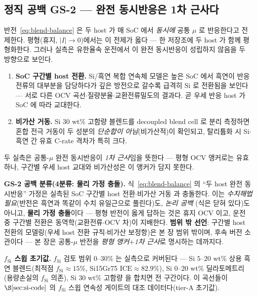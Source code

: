 \subsection{정직 공백 GS-2 --- 완전 동시반응은 1차 근사다}\label{ssec:blend-gs2}
반전~\eqref{eq:blend-balance} 은 두 host 가 매 SoC 에서 \emph{동시에} 공통 $\mu$ 로 반응한다고 전제한다.
평형(휴지, $|I|\!\to\!0$)에서는 이 전제가 옳다 --- 한 저장조에 두 host 가 함께 평형화한다. 그러나 실측은
유한율속 운전에서 이 완전 동시반응이 성립하지 않음을 두 방향으로 보인다.
\begin{enumerate}[label=(\alph*),leftmargin=2.2em,itemsep=1.5pt]
\item \textbf{SoC 구간별 host 전환.} Si/흑연 복합 연속체 모델은 높은 SoC 에서 흑연이 반응전류의 대부분을
담당하다가 깊은 방전으로 갈수록 급격히 Si 로 전환됨을 보인다 --- 서로 다른 OCV 곡선$\cdot$질량분율$\cdot$교환전류밀도의
결과다\cite{ai_composite2022}. 곧 우세 반응 host 가 SoC 에 따라 교대한다.
\item \textbf{비가산 거동.} Si $30$ wt\% 고함량 블렌드를 decoupled blend cell 로 분리 측정하면 혼합 전극
거동이 두 성분의 \emph{단순합이 아님}(비가산적)이 확인되고, 탈리튬화 시 Si$\cdot$흑연 간 유효 C-rate
격차가 특히 크다\cite{chatzogiannakis_blend2025}.
\end{enumerate}
두 실측은 공통-$\mu$ 완전 동시반응이 \emph{1차 근사}임을 뜻한다 --- 평형 OCV 앵커로는 유효하나, 구간별
우세 host 교대와 비가산성은 이 앵커가 담지 못한다.

\begin{warnbox}
\textbf{GS-2 공백 분류(4분류: 물리 가정 충돌).} 식~\eqref{eq:blend-balance} 의 ``두 host 완전 동시반응''
가정은 실측된 SoC 구간별 host 전환\cite{ai_composite2022}$\cdot$비가산 거동\cite{chatzogiannakis_blend2025}
과 충돌한다. 이는 \emph{수치해법 필요}(반전은 흑연과 똑같이 수치 유일근으로 풀린다)도, \emph{논리 공백}
(식은 닫혀 있다)도 아니고, \textbf{물리 가정 충돌}이다 --- 평형 반전이 옳게 답하는 것은 휴지 OCV 이고,
운전 중 구간별 전환은 동역학(교환전류$\cdot$OCV 차)이 지배한다. \textbf{범위 밖 선언}: 구간별 host 전환의
모델링(우세 host 전환 규칙$\cdot$비가산 보정항)은 본 장 범위 밖이며, 후속 버전 소관이다 --- 본 장은
공통-$\mu$ 반전을 \emph{평형 앵커$+$1차 근사}로 명시하는 데까지다.
\end{warnbox}

\textbf{$f_\mathrm{Si}$ 스윕 초기값.} $f_\mathrm{Si}$ 검토 범위 $0$--$30\%$ 는 실측으로 커버된다 ---
Si $5$--$20$ wt\% 상용 흑연 블렌드(최적점 $f_\mathrm{Si}{\approx}15\%$, Si15Gr75 $\mathrm{ICE}\approx82.9\%$)\cite{gautam_blend2024},
Si $0$--$20$ wt\% 딜라토메트리(용량손실의 $f_\mathrm{Si}$ 의존)\cite{moyassari_blend2022}, Si $30$ wt\%
고함량\cite{chatzogiannakis_blend2025} 을 합치면 전 구간이다. 이 곡선들이 $\S\ref{sec:si-code}$ 의
$f_\mathrm{Si}$ 스윕 연속성 게이트의 대조 데이터다(tier-A 초기값).

